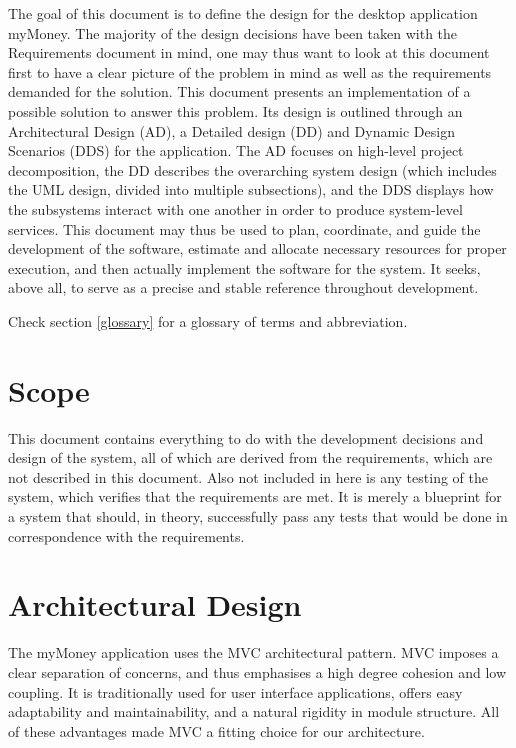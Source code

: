 \documentclass[12pt]{article}
\begin{document}
The goal of this document is to define the design for the desktop application myMoney. The majority of the design decisions have been taken     with the Requirements document in mind, one may thus want to look at this document first to have a clear picture of the problem in mind as well as the requirements demanded for the solution. This document presents an implementation of a possible solution to answer this problem. Its design is outlined through an Architectural Design (AD), a Detailed design (DD) and Dynamic Design Scenarios (DDS) for the application. The AD focuses on high-level project decomposition, the DD describes the overarching system design (which includes the UML design, divided into multiple subsections), and the DDS displays how the subsystems interact with one another in order to produce system-level services. This document may thus be used to plan, coordinate, and guide the development of the software, estimate and allocate necessary resources for proper execution, and  then actually implement the software for the system. It seeks, above all, to serve as a precise and stable reference throughout development.

Check section \ref{glossary} for a glossary of terms and abbreviation.

\section{Scope}

This document contains everything to do with the development decisions and design of the system, all of which are derived from the requirements, which are not described in this document. Also not included in here is any testing of the system, which verifies that the requirements are met. It is merely a blueprint for a system that should, in theory, successfully pass any tests that would be done in correspondence with the requirements.

\section{Architectural Design} \label{sec:arch}

The myMoney application uses the MVC architectural pattern. MVC imposes a clear separation of concerns, and thus emphasises a high degree cohesion and low coupling. It is traditionally used for user interface applications, offers easy adaptability and maintainability, and a natural rigidity in module structure. All of these advantages made MVC a fitting choice for our architecture.
 
\end{document}
